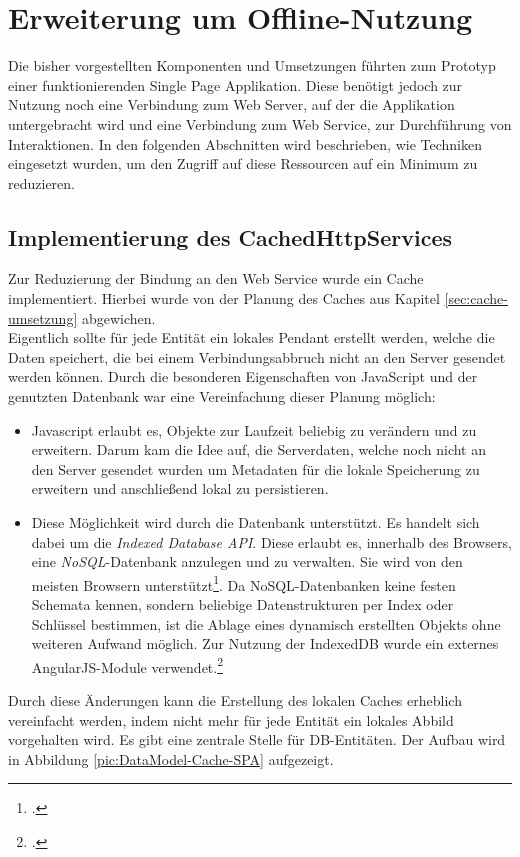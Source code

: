 \section{Erweiterung um Offline-Nutzung}
\label{sec:CachedHttpService}
Die bisher vorgestellten Komponenten und Umsetzungen führten zum Prototyp einer funktionierenden Single Page Applikation. Diese benötigt jedoch zur Nutzung noch eine Verbindung zum Web Server, auf der die Applikation untergebracht wird und eine Verbindung zum Web Service, zur Durchführung von Interaktionen. In den folgenden Abschnitten wird beschrieben, wie Techniken eingesetzt wurden, um den Zugriff auf diese Ressourcen auf ein Minimum zu reduzieren. 
\subsection{Implementierung des CachedHttpServices}
\label{ssec:Implementierung-cachedHttpService}
Zur Reduzierung der Bindung an den Web Service wurde ein Cache implementiert. Hierbei wurde von der Planung des Caches aus Kapitel \ref{sec:cache-umsetzung} abgewichen. \\
Eigentlich sollte für jede Entität ein lokales Pendant erstellt werden, welche die Daten speichert, die bei einem Verbindungsabbruch nicht an den Server gesendet werden können. Durch die besonderen Eigenschaften von JavaScript und der genutzten Datenbank war eine Vereinfachung dieser Planung möglich:
\begin{itemize}
\item Javascript erlaubt es, Objekte zur Laufzeit beliebig zu verändern und zu erweitern. Darum kam die Idee auf, die Serverdaten, welche noch nicht an den Server gesendet wurden um Metadaten für die lokale Speicherung zu erweitern und anschließend lokal zu persistieren.
\item Diese Möglichkeit wird durch die Datenbank unterstützt. Es handelt sich dabei um die \textit{Indexed Database API}. Diese erlaubt es, innerhalb des Browsers, eine \textit{\gls{NoSQL}}-Datenbank anzulegen und zu verwalten. Sie wird von den meisten Browsern unterstützt\footcite{online:caniuse:indexedDB}. Da NoSQL-Datenbanken keine festen Schemata kennen, sondern beliebige Datenstrukturen per Index oder Schlüssel bestimmen, ist die Ablage eines dynamisch erstellten Objekts ohne weiteren Aufwand möglich. Zur Nutzung der IndexedDB wurde ein externes AngularJS-Module verwendet.\footcite{online:AngularJs:indexedDB}
\end{itemize}  
Durch diese Änderungen kann die Erstellung des lokalen Caches erheblich vereinfacht werden, indem nicht mehr für jede Entität ein lokales Abbild vorgehalten wird. Es gibt eine zentrale Stelle für DB-Entitäten. Der Aufbau wird in Abbildung \ref{pic:DataModel-Cache-SPA} aufgezeigt. 

